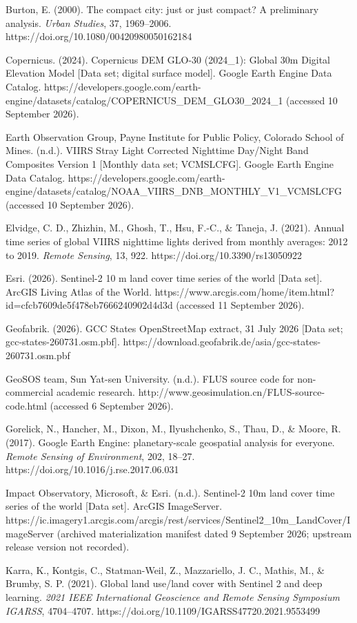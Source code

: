 Burton, E. (2000). The compact city: just or just compact? A preliminary
analysis. \emph{Urban Studies}, 37, 1969--2006.
https://doi.org/10.1080/00420980050162184

Copernicus. (2024). Copernicus DEM GLO-30 (2024\_1): Global 30m Digital
Elevation Model {[}Data set; digital surface model{]}. Google Earth
Engine Data Catalog.
https://developers.google.com/earth-engine/datasets/catalog/COPERNICUS\_DEM\_GLO30\_2024\_1
(accessed 10 September 2026).

Earth Observation Group, Payne Institute for Public Policy, Colorado
School of Mines. (n.d.). VIIRS Stray Light Corrected Nighttime Day/Night
Band Composites Version 1 {[}Monthly data set; VCMSLCFG{]}. Google Earth
Engine Data Catalog.
https://developers.google.com/earth-engine/datasets/catalog/NOAA\_VIIRS\_DNB\_MONTHLY\_V1\_VCMSLCFG
(accessed 10 September 2026).

Elvidge, C. D., Zhizhin, M., Ghosh, T., Hsu, F.-C., \& Taneja, J.
(2021). Annual time series of global VIIRS nighttime lights derived from
monthly averages: 2012 to 2019. \emph{Remote Sensing}, 13, 922.
https://doi.org/10.3390/rs13050922

Esri. (2026). Sentinel-2 10 m land cover time series of the world
{[}Data set{]}. ArcGIS Living Atlas of the World.
https://www.arcgis.com/home/item.html?id=cfcb7609de5f478eb7666240902d4d3d
(accessed 11 September 2026).

Geofabrik. (2026). GCC States OpenStreetMap extract, 31 July 2026
{[}Data set; gcc-states-260731.osm.pbf{]}.
https://download.geofabrik.de/asia/gcc-states-260731.osm.pbf

GeoSOS team, Sun Yat-sen University. (n.d.). FLUS source code for
non-commercial academic research.
http://www.geosimulation.cn/FLUS-source-code.html (accessed 6 September
2026).

Gorelick, N., Hancher, M., Dixon, M., Ilyushchenko, S., Thau, D., \&
Moore, R. (2017). Google Earth Engine: planetary-scale geospatial
analysis for everyone. \emph{Remote Sensing of Environment}, 202,
18--27. https://doi.org/10.1016/j.rse.2017.06.031

Impact Observatory, Microsoft, \& Esri. (n.d.). Sentinel-2 10m land
cover time series of the world {[}Data set{]}. ArcGIS ImageServer.
https://ic.imagery1.arcgis.com/arcgis/rest/services/Sentinel2\_10m\_LandCover/ImageServer
(archived materialization manifest dated 9 September 2026; upstream
release version not recorded).

Karra, K., Kontgis, C., Statman-Weil, Z., Mazzariello, J. C., Mathis,
M., \& Brumby, S. P. (2021). Global land use/land cover with Sentinel 2
and deep learning. \emph{2021 IEEE International Geoscience and Remote
Sensing Symposium IGARSS}, 4704--4707.
https://doi.org/10.1109/IGARSS47720.2021.9553499

